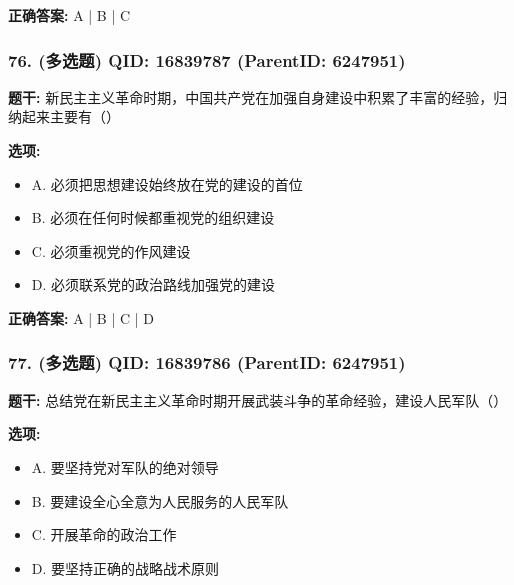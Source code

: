 \documentclass[12pt,UTF8]{ctexart}
\begin{document}
\textbf{正确答案:}
A | B | C

\vspace{0.3em}\hrulefill\vspace{0.7em}

\subsubsection*{76. (多选题) \small QID: 16839787 (ParentID: 6247951)}

\textbf{题干:}
新民主主义革命时期，中国共产党在加强自身建设中积累了丰富的经验，归纳起来主要有（）



\textbf{选项:}
\begin{itemize}[leftmargin=*]

  \item A. 必须把思想建设始终放在党的建设的首位

  \item B. 必须在任何时候都重视党的组织建设

  \item C. 必须重视党的作风建设

  \item D. 必须联系党的政治路线加强党的建设

\end{itemize}

\textbf{正确答案:}
A | B | C | D

\vspace{0.3em}\hrulefill\vspace{0.7em}

\subsubsection*{77. (多选题) \small QID: 16839786 (ParentID: 6247951)}

\textbf{题干:}
总结党在新民主主义革命时期开展武装斗争的革命经验，建设人民军队（）



\textbf{选项:}
\begin{itemize}[leftmargin=*]

  \item A. 要坚持党对军队的绝对领导

  \item B. 要建设全心全意为人民服务的人民军队

  \item C. 开展革命的政治工作

  \item D. 要坚持正确的战略战术原则

\end{itemize}
\end{document}
